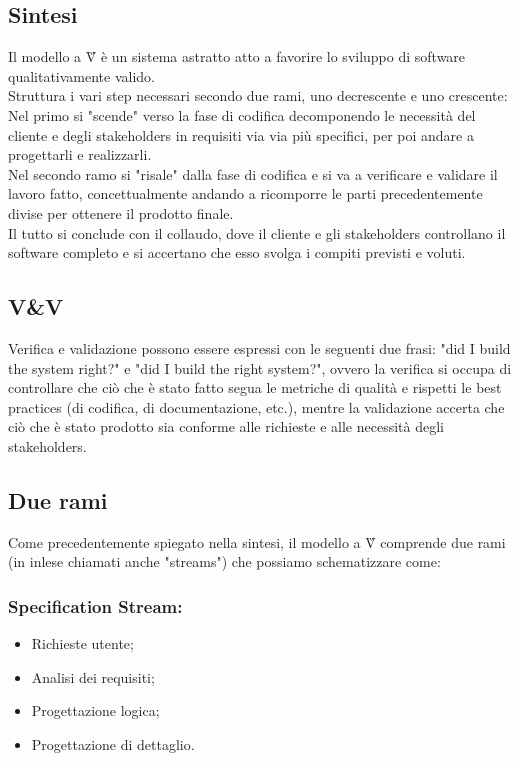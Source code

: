 \subsection{Sintesi}
Il modello a V\G{} è un sistema astratto atto a favorire lo sviluppo di software qualitativamente valido.\\
Struttura i vari step necessari secondo due rami, uno decrescente e uno crescente:\\
Nel primo si "scende" verso la fase di codifica decomponendo le necessità del cliente e degli stakeholders
in requisiti via via più specifici, per poi andare a progettarli e realizzarli.\\
Nel secondo ramo si "risale" dalla fase di codifica e si va a verificare e validare il lavoro fatto,
concettualmente andando a ricomporre le parti precedentemente divise per ottenere il prodotto finale.\\
Il tutto si conclude con il collaudo, dove il cliente e gli stakeholders controllano il software completo
e si accertano che esso svolga i compiti previsti e voluti. 

\subsection{V\&V}
Verifica e validazione possono essere espressi con le seguenti due frasi: "did I build the system right?"
e "did I build the right system?", ovvero la verifica si occupa di controllare che ciò che è stato
fatto segua le metriche di qualità e rispetti le best practices (di codifica, di documentazione, etc.), 
mentre la validazione accerta che ciò che è stato prodotto sia conforme alle
richieste e alle necessità degli stakeholders.

\subsection{Due rami}
Come precedentemente spiegato nella sintesi, il modello a V\G{} comprende due rami (in inlese chiamati anche
"streams") che possiamo schematizzare come: 
\subsubsection*{Specification Stream:}
\begin{itemize}
    \item Richieste utente;
    \item Analisi dei requisiti;
    \item Progettazione logica;
    \item Progettazione di dettaglio.
\end{itemize}

